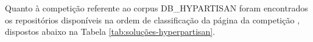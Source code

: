         
        
        
    
    
    
    
        
        
        
        
        
    Quanto à competição referente ao corpus DB\_HYPARTISAN foram encontrados os repositórios disponíveis na ordem de classificação da página da competição \cite{PAN_HND_2019}, dispostos abaixo na Tabela \ref{tab:soluções-hyperpartisan}.
    
